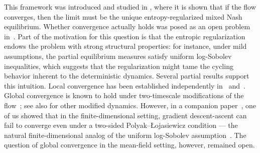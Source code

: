 \documentclass[11pt]{amsart}
\theoremstyle{remark}
\theoremstyle{definition}
\numberwithin{equation}{section}
\numberwithin{proposition}{section}
\newcommand{\1}{\mathbf{1}}
\begin{document}
This framework was introduced and studied in \cite{domingo2020mean}, where it is shown that if the flow converges, then the limit must be the unique entropy-regularized mixed Nash equilibrium. Whether convergence actually holds was posed as an open problem in~\cite{wang2024open}. Part of the motivation for this question is that the entropic regularization endows the problem with strong structural properties: for instance, under mild assumptions, the partial equilibrium measures satisfy uniform log-Sobolev inequalities, which suggests that the regularization might tame the cycling behavior inherent to the deterministic dynamics.
Several partial results support this intuition. Local convergence has been established independently in~\cite{seo2026local} and~\cite{wang2026local}. Global convergence is known to hold under two-timescale modifications of the flow~\cite{lu2023two, ma2022provably}; see also \cite{kim2024symmetric} for other modified dynamics. However, in a companion paper~\cite{mourrat2026pl}, one of us showed that in the finite-dimensional setting, gradient descent-ascent can fail to converge even under a two-sided Polyak–Łojasiewicz condition — the natural finite-dimensional analog of the uniform log-Sobolev assumption~\cite{otto2000generalization}. The question of global convergence in the mean-field setting, however, remained open.
\end{document}
